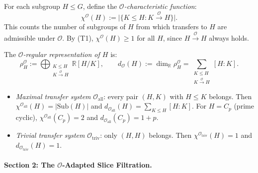 \begin{definition}\label{def:p5-chi}
For each subgroup $H \leq G$, define the
\emph{$\mathcal{O}$-characteristic function}:
\[
  \chi^{\mathcal{O}}(H) := \bigl|\{K \leq H : K \xrightarrow{\mathcal{O}} H\}\bigr|.
\]
This counts the number of subgroups of $H$ from which transfers to $H$
are admissible under $\mathcal{O}$. By (T1), $\chi^{\mathcal{O}}(H) \geq 1$
for all $H$, since $H \xrightarrow{\mathcal{O}} H$ always holds.
\end{definition}

\begin{definition}\label{def:p5-rho}
The \emph{$\mathcal{O}$-regular representation of $H$} is:
\[
  \rho_H^{\mathcal{O}} := \bigoplus_{\substack{K \leq H \\ K \xrightarrow{\mathcal{O}} H}} \mathbb{R}[H/K],
  \qquad
  d_{\mathcal{O}}(H) := \dim_{\mathbb{R}} \rho_H^{\mathcal{O}}
  = \sum_{\substack{K \leq H \\ K \xrightarrow{\mathcal{O}} H}} [H:K].
\]
\end{definition}

\begin{remark}\label{rem:p5-special}
\begin{itemize}
  \item \emph{Maximal transfer system} $\mathcal{O}_{\mathrm{all}}$:
    every pair $(H,K)$ with $H \leq K$ belongs. Then $\chi^{\mathcal{O}_{\mathrm{all}}}(H) = |\mathrm{Sub}(H)|$
    and $d_{\mathcal{O}_{\mathrm{all}}}(H) = \sum_{K \leq H} [H:K]$.
    For $H = C_p$ (prime cyclic), $\chi^{\mathcal{O}_{\mathrm{all}}}(C_p) = 2$
    and $d_{\mathcal{O}_{\mathrm{all}}}(C_p) = 1 + p$.
  \item \emph{Trivial transfer system} $\mathcal{O}_{\mathrm{triv}}$:
    only $(H,H)$ belongs. Then $\chi^{\mathcal{O}_{\mathrm{triv}}}(H) = 1$
    and $d_{\mathcal{O}_{\mathrm{triv}}}(H) = 1$.
\end{itemize}
\end{remark}


\paragraph{Section 2: The $\mathcal{O}$-Adapted Slice Filtration.}

